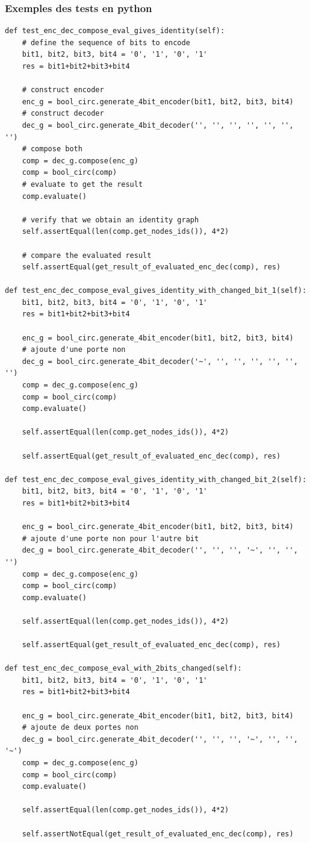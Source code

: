 \documentclass[a4paper,12pt]{article}
\begin{document}
\subsubsection*{Exemples des tests en python}
\begin{lstlisting}[caption={tests}, label={lst:tests-de-encodeur}]
def test_enc_dec_compose_eval_gives_identity(self):
    # define the sequence of bits to encode
    bit1, bit2, bit3, bit4 = '0', '1', '0', '1'
    res = bit1+bit2+bit3+bit4

    # construct encoder
    enc_g = bool_circ.generate_4bit_encoder(bit1, bit2, bit3, bit4)
    # construct decoder
    dec_g = bool_circ.generate_4bit_decoder('', '', '', '', '', '', '')
    # compose both
    comp = dec_g.compose(enc_g)
    comp = bool_circ(comp)
    # evaluate to get the result
    comp.evaluate()

    # verify that we obtain an identity graph
    self.assertEqual(len(comp.get_nodes_ids()), 4*2) 

    # compare the evaluated result
    self.assertEqual(get_result_of_evaluated_enc_dec(comp), res)

def test_enc_dec_compose_eval_gives_identity_with_changed_bit_1(self):
    bit1, bit2, bit3, bit4 = '0', '1', '0', '1'
    res = bit1+bit2+bit3+bit4

    enc_g = bool_circ.generate_4bit_encoder(bit1, bit2, bit3, bit4)
    # ajoute d'une porte non
    dec_g = bool_circ.generate_4bit_decoder('~', '', '', '', '', '', '')
    comp = dec_g.compose(enc_g)
    comp = bool_circ(comp)
    comp.evaluate()

    self.assertEqual(len(comp.get_nodes_ids()), 4*2) 

    self.assertEqual(get_result_of_evaluated_enc_dec(comp), res)

def test_enc_dec_compose_eval_gives_identity_with_changed_bit_2(self):
    bit1, bit2, bit3, bit4 = '0', '1', '0', '1'
    res = bit1+bit2+bit3+bit4

    enc_g = bool_circ.generate_4bit_encoder(bit1, bit2, bit3, bit4)
    # ajoute d'une porte non pour l'autre bit
    dec_g = bool_circ.generate_4bit_decoder('', '', '', '~', '', '', '')
    comp = dec_g.compose(enc_g)
    comp = bool_circ(comp)
    comp.evaluate()

    self.assertEqual(len(comp.get_nodes_ids()), 4*2) 

    self.assertEqual(get_result_of_evaluated_enc_dec(comp), res)

def test_enc_dec_compose_eval_with_2bits_changed(self):
    bit1, bit2, bit3, bit4 = '0', '1', '0', '1'
    res = bit1+bit2+bit3+bit4

    enc_g = bool_circ.generate_4bit_encoder(bit1, bit2, bit3, bit4)
    # ajoute de deux portes non
    dec_g = bool_circ.generate_4bit_decoder('', '', '', '~', '', '', '~')
    comp = dec_g.compose(enc_g)
    comp = bool_circ(comp)
    comp.evaluate()

    self.assertEqual(len(comp.get_nodes_ids()), 4*2) 

    self.assertNotEqual(get_result_of_evaluated_enc_dec(comp), res)
\end{lstlisting}
\end{document}
